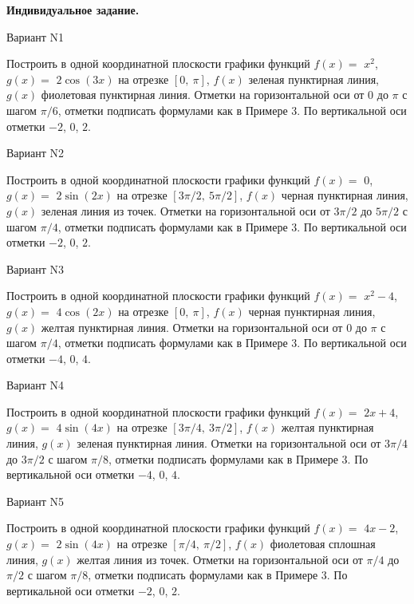 \documentclass[11pt]{report}
\begin{document}
\pagestyle{empty}

{\bf Индивидуальное задание.}

 Вариант N1

Построить в одной координатной плоскости графики функций $f(x) = $
    $x^{2}$, $g(x) = $
    $2 \cos{\left(3 x \right)}$ на 
    отрезке $\left[ 0, \  \pi\right]$, $f(x)$ зеленая 
    пунктирная линия, $g(x)$ фиолетовая пунктирная линия. 
    Отметки на горизонтальной оси от $0$ до $\pi$ с 
    шагом $\pi / 6$, отметки подписать формулами как в Примере 3.  
    По вертикальной оси отметки $-2$, 0, $2$.

Вариант N2

Построить в одной координатной плоскости графики функций $f(x) = $
    $0$, $g(x) = $
    $2 \sin{\left(2 x \right)}$ на 
    отрезке $\left[ 3 \pi / 2, \  5 \pi / 2\right]$, $f(x)$ черная 
    пунктирная линия, $g(x)$ зеленая линия из точек. 
    Отметки на горизонтальной оси от $3 \pi / 2$ до $5 \pi / 2$ с 
    шагом $\pi / 4$, отметки подписать формулами как в Примере 3.  
    По вертикальной оси отметки $-2$, 0, $2$.

Вариант N3

Построить в одной координатной плоскости графики функций $f(x) = $
    $x^{2} - 4$, $g(x) = $
    $4 \cos{\left(2 x \right)}$ на 
    отрезке $\left[ 0, \  \pi\right]$, $f(x)$ черная 
    пунктирная линия, $g(x)$ желтая пунктирная линия. 
    Отметки на горизонтальной оси от $0$ до $\pi$ с 
    шагом $\pi / 4$, отметки подписать формулами как в Примере 3.  
    По вертикальной оси отметки $-4$, 0, $4$.

Вариант N4

Построить в одной координатной плоскости графики функций $f(x) = $
    $2 x + 4$, $g(x) = $
    $4 \sin{\left(4 x \right)}$ на 
    отрезке $\left[ 3 \pi / 4, \  3 \pi / 2\right]$, $f(x)$ желтая 
    пунктирная линия, $g(x)$ зеленая пунктирная линия. 
    Отметки на горизонтальной оси от $3 \pi / 4$ до $3 \pi / 2$ с 
    шагом $\pi / 8$, отметки подписать формулами как в Примере 3.  
    По вертикальной оси отметки $-4$, 0, $4$.

Вариант N5

Построить в одной координатной плоскости графики функций $f(x) = $
    $4 x - 2$, $g(x) = $
    $2 \sin{\left(4 x \right)}$ на 
    отрезке $\left[ \pi / 4, \  \pi / 2\right]$, $f(x)$ фиолетовая 
    сплошная линия, $g(x)$ желтая линия из точек. 
    Отметки на горизонтальной оси от $\pi / 4$ до $\pi / 2$ с 
    шагом $\pi / 8$, отметки подписать формулами как в Примере 3.  
    По вертикальной оси отметки $-2$, 0, $2$.
\end{document}
